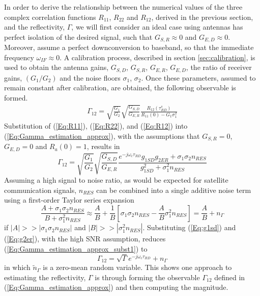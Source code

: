 \documentclass[draftcls,onecolumn]{IEEEtran}  %
\begin{document}
In order to derive the relationship between the numerical values of the three complex correlation functions $R_{11}$, $R_{22}$ and $R_{12}$, derived in the previous section, and the reflectivity, $\Gamma$, we will first consider an ideal case using  
antennas has perfect isolation of the desired signal, such that
 $G_{S,R}\approx 0 $ and $G_{E,D}\approx 0$. 
Moreover, assume a perfect downconversion to baseband, so that the immediate frequency $\omega_{IF} \approx 0$. 
A calibration process, described in section \ref{sec:calibration},  is used to obtain the antenna gains, $G_{S,D}$, $G_{S,R}$, $G_{E,R}$, $G_{E,D}$, the ratio of receiver gains, $(G_1/G_2)$ and the noise floors $\sigma_1$, $\sigma_2$. 
Once these parameters, assumed to remain constant after calibration, are obtained, the following observable is formed. 
\begin{eqnarray}
 \Gamma_{12} =	\sqrt{\frac{G_1}{G_2}}\sqrt{\frac{G_{S,D}}{G_{E,R}}} \frac{R_{12}(\tau^s_{RD})}{R_{11}(0)-G_1\sigma_1^2}  
    \label{Eq:Gamma_estimation_approx}
\end{eqnarray}
Substitution of (\ref{Eq:R11}), (\ref{Eq:R22}), and (\ref{Eq:R12}) into
(\ref{Eq:Gamma_estimation_approx}), with the assumptions that $G_{S,R}=0$, 
$G_{E,D}=0$ and $R_a(0)=1$, results in
\begin{equation}
\Gamma_{12} = \sqrt{\frac{G_1}{G_2}} \sqrt{\frac{G_{S,D}}{G_{E,R}}} 
  \frac{e^{-j \omega_c \tau_{RD}} g_{1SD} g_{2ER} +\sigma_1 \sigma_2 n_{RES}}
     {g_{1SD}^2 + \sigma_1^2 n_{RES}}
     \label{Eq:Gamma_estimation_approx_subst1}
\end{equation}
Assuming a high signal to noise ratio, as would be expected for satellite communication signals, $n_{RES}$ can be combined into a single additive noise term using a first-order Taylor series expansion
\begin{equation}
    \frac{A+\sigma_1 \sigma_2 n_{RES}}{B+\sigma_1^2 n_{RES}} \approx \frac{A}{B} + 
   \frac{1}{B}\left[\sigma_1 \sigma_2 n_{RES}- \frac{A}{B}\sigma_1^2 n_{RES}\right] =\frac{A}{B}    +n_{\Gamma}
\end{equation}
if $|A|>> |\sigma_1 \sigma_2 n_{RES}|$ and $|B| >> |\sigma_1 ^2 n_{RES}|$.
Substituting (\ref{Eq:g1sd}) and (\ref{Eq:g2er}), with the high SNR assumption, reduces (\ref{Eq:Gamma_estimation_approx_subst1}) to 
\begin{equation}
    \Gamma_{12} = \sqrt{\Gamma} e^{-j \omega_c \tau_{RD}} + n_\Gamma
\end{equation}
in which $\tilde{n}_\Gamma$ is a zero-mean random variable. This shows one approach to estimating the reflectivity, $\Gamma$ is through forming the observable $\Gamma_{12}$ defined in (\ref{Eq:Gamma_estimation_approx}) and then computing the magnitude.  
\end{document}
